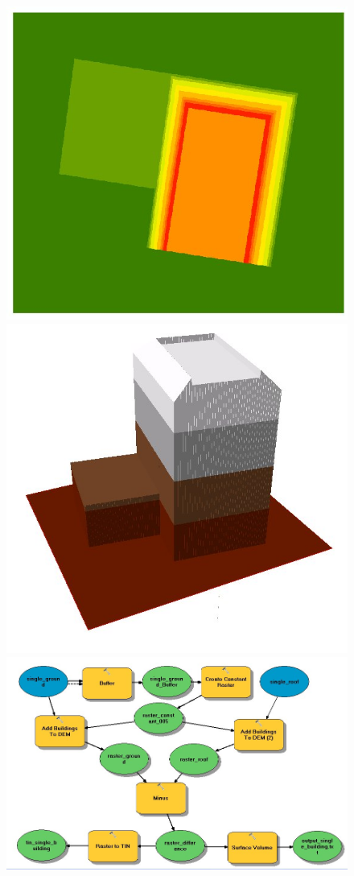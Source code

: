 \begin{figure}[h]
	 \includegraphics[scale=0.1]{phase1/group1/raster_diff.jpg} 
	 \includegraphics[scale=0.1]{phase1/group1/arcscene_tin.jpg} 
	 \includegraphics[scale=0.1]{phase1/group1/modelbuilder.jpg} 

\end{figure}

